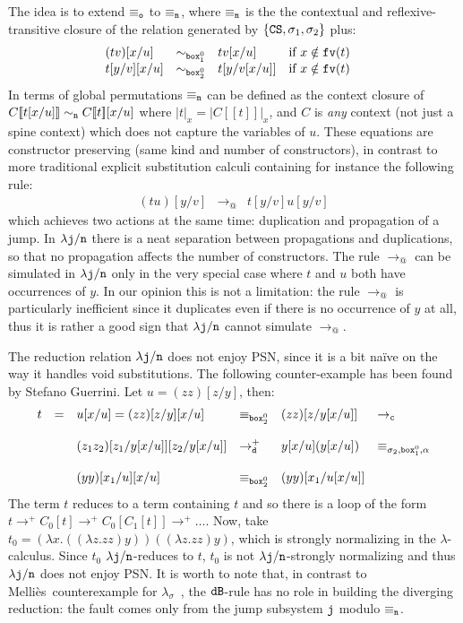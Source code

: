 \documentclass{LMCS}
\renewcommand{\>}{\rightarrow}
\def\lam{\lambda}
\def\sig{\sigma}
\newcommand{\Rew}[1]{\rightarrow_{#1}}
\newcommand{\lsigma}{\lam_{\sigma}}
\newcommand{\B}{{\tt dB}}
\newcommand{\dis}{{\tt j}}
\newcommand{\ldis}{\lam{\dis}}
\newcommand{\Rewplus}[1]{\rightarrow^{+}_{#1}}
\newcommand{\fv}[1]{{\tt fv}(#1)}
\newcommand{\Var}{{\tt d}}
\newcommand{\DSubs}{{\tt c}}
\newcommand{\CS}{{\tt CS}}
\newcommand{\set}[1]{ \{ #1 \}}
\newcommand{\mellies}{Melli{\`e}s}
\newcommand{\eqo}{\equiv_\osym}
\newcommand{\preeqw}[1]{\sim_{#1}}
\newcommand{\osym}{{\tt o}}
\newcommand{\ldisfz}{\ldis/\fz}
\newcommand{\eqfz}{\equiv_\fz}
\newcommand{\fz}{{\tt n}}
\newcommand{\ctx}[2]{#1 [ \! [#2] \! ]}
\newcommand{\boite}{{\tt box}}
\newcommand{\sigt}{\boite_1}
\newcommand{\sigq}{\boite_2}
\begin{document}
The idea is to extend $\eqo$ to $\eqfz$, where $\eqfz$
is the the contextual and reflexive-transitive closure
of the relation
generated by $\set{\CS, \sig_1, \sig_2}$ plus:
\[ \begin{array}{llll@{\hspace{.5cm}}l}
(t v)[x/u]     & \preeqw{\sigt^0} & t v[x/u]    & \mbox{if } x \notin \fv{t}\\
t[y/v][x/u]    & \preeqw{\sigq^0} & t[y/v[x/u]] & \mbox{if } x\notin \fv{t}\\
\end{array}\]
In terms of global permutations $\eqfz$ can be defined as the
  context closure of $\ctx{C}{t[x/u]}\sim_\fz\ctx{C}{t}[x/u]$ where
  $|t|_x=|\ctx{C}{t}|_x$, and $C$ is \textit{any}
  context (not just a spine context) which does not capture the
  variables of $u$.  These equations are constructor preserving (same
kind and number of constructors), in contrast to more traditional
explicit substitution calculi containing for instance the following 
rule:
\[ \begin{array}{cccc}
(t u)[y/v]& \Rew{@} & t[y/v] u[y/v]
\end{array}\]
which achieves two actions at the same time: 
duplication and propagation of a jump. In $\ldisfz$ there is a
neat separation between propagations and duplications, so that no
propagation affects the number of constructors.  The rule $\Rew{@}$
can be simulated in $\ldisfz$ only in the very special case where $t$
and $u$ both have occurrences of $y$. In our opinion this is not a
limitation: the rule $\Rew{@}$ is particularly inefficient since it
duplicates even if there is no occurrence of $y$ at all, thus it is
rather a good sign that $\ldisfz$ cannot simulate $\Rew{@}$.\medskip

The reduction relation $\ldisfz$ does not enjoy PSN, since it is a bit na\"ive
on the way it handles void substitutions. The following counter-example has been found by Stefano
Guerrini. Let  $u=(z z) [z/y]$, then:
\[ \begin{array}{lllllllll}
   t&=&u [x/u] = (z z) [z/y][x/u] & \equiv_{\sigq^0}  & 
   (z z) [z/y[x/u]] & \Rew{\DSubs} \\\\
   &&(z_1 z_2)  [z_1/y[x/u]]  [z_2/y[x/u]] & \Rewplus{\Var} & 
   y[x/u] (y [x/u]) & \equiv_{\sigma_2,\sigt^0, \alpha}  \\\\
   &&(y y) [x_1/u] [x/u] & \equiv_{\sigq^0} & (y y) [x_1/u[x/u]]
   \end{array} \]
The term $t$ reduces to a term containing $t$ and so there is a loop
of the form $t \Rewplus{} C_0[t] \Rewplus{} C_0[C_1[t]] \Rewplus{}
\ldots$.  Now, take $t_0=(\lam x.((\lam z. z z) y)) ((\lam z. z z) y)$,
which is strongly normalizing in the $\lam$-calculus.  Since $t_0$
$\ldisfz$-reduces to $t$, $t_0$ is not $\ldisfz$-strongly normalizing
and thus $\ldisfz$ does not enjoy PSN. It is worth to note that, in
contrast to \mellies\ counterexample for $\lsigma$~\cite{Mellies1995a}, the $\B$-rule has
no role in building the diverging reduction: the fault comes only from the
jump subsystem $\dis$ modulo $\eqfz$.\medskip
\end{document}
